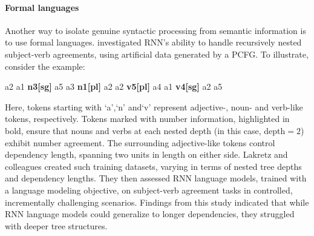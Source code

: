 \paragraph{Formal languages} Another way to isolate genuine syntactic processing from semantic information is to use formal languages. \cite{lakretz2021can} investigated RNN's ability to handle recursively nested subject-verb agreements, using artificial data generated by a PCFG. To illustrate, consider the example:
\begin{exe}
    \ex a2 a1 \textbf{n3[sg]} a5 a3 \textbf{n1[pl]} a2 a2 \textbf{v5[pl]} a4 a1 \textbf{v4[sg]} a2 a5
\end{exe}
Here, tokens starting with `a',`n' and`v' represent adjective-, noun- and verb-like tokens, respectively. Tokens marked with number information, highlighted in bold, ensure that nouns and verbs at each nested depth (in this case, depth$=2$) exhibit number agreement. The surrounding adjective-like tokens control dependency length, spanning two units in length on either side. Lakretz and colleagues created such training datasets, varying in terms of nested tree depths and dependency lengths. They then assessed RNN language models, trained with a language modeling objective, on subject-verb agreement tasks in controlled, incrementally challenging scenarios. Findings from this study indicated that while RNN language models could generalize to longer dependencies, they struggled with deeper tree structures.


